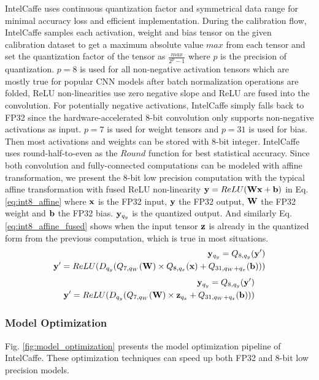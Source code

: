 IntelCaffe uses continuous quantization factor and symmetrical data range for minimal accuracy loss and efficient implementation. During the calibration flow, IntelCaffe samples each activation, weight and bias tensor on the given calibration dataset to get a maximum absolute value $max$ from each tensor and set the quantization factor of the tensor as $\frac{max}{2^p-1}$ where $p$ is the precision of quantization. $p=8$ is used for all non-negative activation tensors which are mostly true for popular CNN models after batch normalization operations are folded, ReLU non-linearities use zero negative slope \cite{DBLP:journals/corr/XuWCL15} and ReLU are fused into the convolution. For potentially negative activations, IntelCaffe simply falls back to FP32 since the hardware-accelerated 8-bit convolution only supports non-negative activations as input. $p=7$ is used for weight tensors and $p=31$ is used for bias. Then most activations and weights can be stored with 8-bit integer. IntelCaffe uses round-half-to-even as the $Round$ function for best statistical accuracy. Since both convolution and fully-connected computations can be modeled with affine transformation, we present the 8-bit low precision computation with the typical affine transformation with fused ReLU non-linearity ${\bf y}=ReLU({\bf Wx}+{\bf b})$ in Eq.\ref{eq:int8_affine} where ${\bf x}$ is the FP32 input, ${\bf y}$ the FP32 output, ${\bf W}$ the FP32 weight and ${\bf b}$ the FP32 bias. ${\bf y}_{q_y}$ is the quantized output. And similarly Eq.\ref{eq:int8_affine_fused} shows when the input tensor ${\bf z}$ is already in the quantized form from the previous computation, which is true in most situations.
\begin{align} \label{eq:int8_affine}
\begin{split}
  {\bf y}_{q_y} = Q_{8,q_y}({\bf y'})
  \\
  {\bf y'} = ReLU(D_{q_y}(Q_{7,q_W}({\bf W})\times Q_{8,q_x}({\bf x})+Q_{31,q_W+q_x}({\bf b})))
\end{split}
\end{align}
\begin{align} \label{eq:int8_affine_fused}
\begin{split}
  {\bf y}_{q_y} = Q_{8,q_y}({\bf y'})
  \\
  {\bf y'} = ReLU(D_{q_y}(Q_{7,q_W}({\bf W})\times {\bf z}_{q_z}+Q_{31,q_W+q_z}({\bf b})))
\end{split}
\end{align}
\subsubsection{Model Optimization}
\label{sec:model_opt}
Fig. \ref{fig:model_optimization} presents the model optimization pipeline of IntelCaffe. These optimization techniques can speed up both FP32 and 8-bit low precision models.

